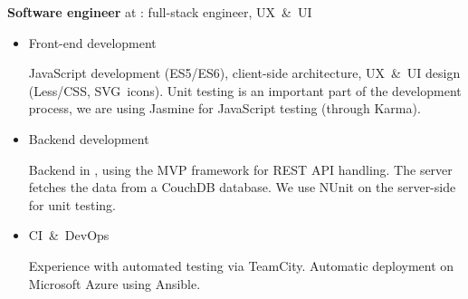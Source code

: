 \begin{rubric}{
}


\textbf{Software engineer} at : full-stack engineer, UX~\&~UI

\begin{itemize}
\item Front-end development

  JavaScript development (ES5/ES6), client-side architecture, UX~\&~UI design (Less/CSS,
  SVG~icons).  Unit testing is an important part of the development process, we
  are using Jasmine for JavaScript testing (through Karma).

\item Backend development

Backend in \Csharp, using the MVP framework for REST API handling. The server
fetches the data from a CouchDB database. We use NUnit on the server-side for unit testing.

\item CI~\&~DevOps

Experience with automated testing via TeamCity.
Automatic deployment on Microsoft Azure using Ansible.
\end{itemize}







\end{rubric}

